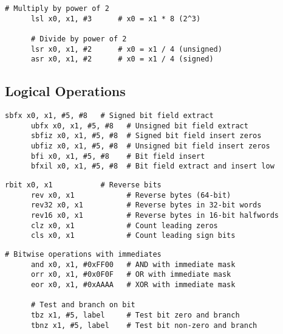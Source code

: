   \begin{definition}
    \begin{lstlisting}[language=arm]
      # Multiply by power of 2
      lsl x0, x1, #3      # x0 = x1 * 8 (2^3)
      
      # Divide by power of 2
      lsr x0, x1, #2      # x0 = x1 / 4 (unsigned)
      asr x0, x1, #2      # x0 = x1 / 4 (signed)
    \end{lstlisting}
  \end{definition}

\subsection{Logical Operations}

  \begin{definition}
    \begin{lstlisting}[language=arm]
      sbfx x0, x1, #5, #8   # Signed bit field extract
      ubfx x0, x1, #5, #8   # Unsigned bit field extract  
      sbfiz x0, x1, #5, #8  # Signed bit field insert zeros
      ubfiz x0, x1, #5, #8  # Unsigned bit field insert zeros
      bfi x0, x1, #5, #8    # Bit field insert
      bfxil x0, x1, #5, #8  # Bit field extract and insert low
    \end{lstlisting}
  \end{definition}

  \begin{definition}
    \begin{lstlisting}[language=arm]
      rbit x0, x1           # Reverse bits
      rev x0, x1            # Reverse bytes (64-bit)
      rev32 x0, x1          # Reverse bytes in 32-bit words
      rev16 x0, x1          # Reverse bytes in 16-bit halfwords
      clz x0, x1            # Count leading zeros
      cls x0, x1            # Count leading sign bits
    \end{lstlisting}
  \end{definition}

  \begin{definition}
    \begin{lstlisting}[language=arm]
      # Bitwise operations with immediates
      and x0, x1, #0xFF00   # AND with immediate mask
      orr x0, x1, #0x0F0F   # OR with immediate mask
      eor x0, x1, #0xAAAA   # XOR with immediate mask
      
      # Test and branch on bit
      tbz x1, #5, label     # Test bit zero and branch
      tbnz x1, #5, label    # Test bit non-zero and branch
    \end{lstlisting}
  \end{definition}


